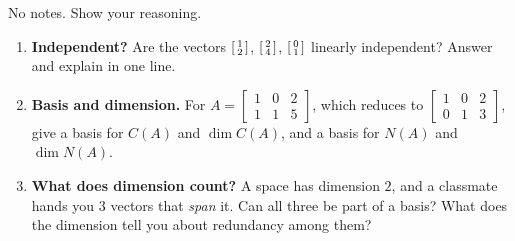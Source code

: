 \documentclass[10pt]{article}
\begin{document}
\namedateperiod

\vspace{0.15in}

No notes. Show your reasoning.

\begin{enumerate}[leftmargin=1.8em, itemsep=16pt]
  \item \textbf{Independent?} Are the vectors $\begin{bsmallmatrix} 1\\2 \end{bsmallmatrix}$,
        $\begin{bsmallmatrix} 2\\4 \end{bsmallmatrix}$, $\begin{bsmallmatrix} 0\\1 \end{bsmallmatrix}$
        linearly independent? Answer and explain in one line.
  \item \textbf{Basis and dimension.} For $A=\begin{bmatrix} 1 & 0 & 2 \\ 1 & 1 & 5 \end{bmatrix}$, which
        reduces to $\begin{bmatrix} 1 & 0 & 2 \\ 0 & 1 & 3 \end{bmatrix}$, give a basis for $C(A)$ and
        $\dim C(A)$, and a basis for $N(A)$ and $\dim N(A)$.
  \item \textbf{What does dimension count?} A space has dimension $2$, and a classmate hands you $3$
        vectors that \emph{span} it. Can all three be part of a basis? What does the dimension tell you
        about redundancy among them?
\end{enumerate}
\end{document}
